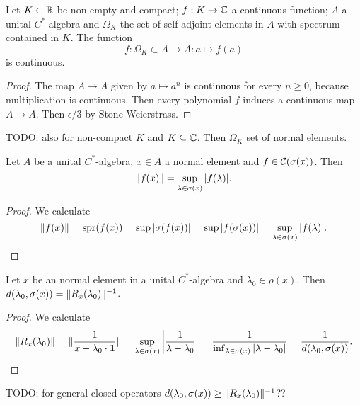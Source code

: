 \begin{proposition} \label{continuityContinuousFunctionalCalculus}
Let $K\subset \mathbb{R}$ be non-empty and compact; $f:K\to \mathbb{C}$ a continuous function; $A$ a unital $C^*$-algebra and $\Omega_K$ the set of self-adjoint elements in $A$ with spectrum contained in $K$. The function
\[ f: \Omega_K\subset A \to A: a\mapsto f(a) \]
is continuous.
\end{proposition}
\begin{proof}
The map $A\to A$ given by $a\mapsto a^n$ is continuous for every $n\geq 0$, because multiplication is continuous. Then every polynomial $f$ induces a continuous map $A\to A$.
Then $\epsilon/3$ by Stone-Weierstrass.
\end{proof}
TODO: also for non-compact $K$ and $K\subseteq \mathbb{C}$. Then $\Omega_K$ set of normal elements.

\begin{proposition}
Let $A$ be a unital $C^*$-algebra, $x\in A$ a normal element and $f\in \operatorname{\mathcal{C}}(\sigma(x))$. Then
\[ \lVert f(x)\rVert = \sup_{\lambda\in \sigma(x)}|f(\lambda)|. \]
\end{proposition}
\begin{proof}
We calculate
\[ \lVert f(x)\rVert = \operatorname{spr}(f(x)) = \sup |\sigma(f(x))| = \sup |f(\sigma(x))| = \sup_{\lambda\in \sigma(x)}|f(\lambda)|. \]
\end{proof}
\begin{corollary}
Let $x$ be an normal element in a unital $C^*$-algebra and $\lambda_0 \in \rho(x)$. Then $d(\lambda_0, \sigma(x)) = \lVert R_x(\lambda_0)\rVert^{-1}$.
\end{corollary}
\begin{proof}
We calculate
\[ \lVert R_x(\lambda_0)\rVert = \lVert\frac{1}{x-\lambda_0\cdot \boldsymbol{\mathrm{1}}}\rVert = \sup_{\lambda\in \sigma(x)}\left|\frac{1}{\lambda - \lambda_0}\right| = \frac{1}{\inf_{\lambda\in \sigma(x)}|\lambda- \lambda_0|} = \frac{1}{d(\lambda_0, \sigma(x))}. \]
\end{proof}
TODO: for general closed operators $d(\lambda_0, \sigma(x)) \geq \lVert R_x(\lambda_0)\rVert^{-1}$??

